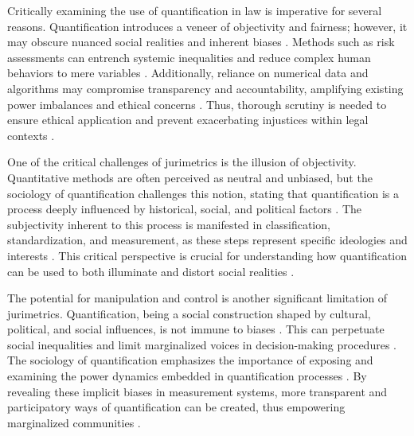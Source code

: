 Critically examining the use of quantification in law is imperative for several reasons. Quantification introduces a veneer of objectivity and fairness; however, it may obscure nuanced social realities and inherent biases \cite{gillborn2017,di2023,calvo2024}. Methods such as risk assessments can entrench systemic inequalities and reduce complex human behaviors to mere variables \cite{lynch2019,sareen2020,demortain2019}. Additionally, reliance on numerical data and algorithms may compromise transparency and accountability, amplifying existing power imbalances and ethical concerns \cite{ant2019,ribeiro2021}. Thus, thorough scrutiny is needed to ensure ethical application and prevent exacerbating injustices within legal contexts \cite{calvo2024,paiva2021}.

One of the critical challenges of jurimetrics is the illusion of objectivity. Quantitative methods are often perceived as neutral and unbiased, but the sociology of quantification challenges this notion, stating that quantification is a process deeply influenced by historical, social, and political factors \cite{10.1007/978-3-319-44000-215,10.3390/fi9040068}. The subjectivity inherent to this process is manifested in classification, standardization, and measurement, as these steps represent specific ideologies and interests \cite{10.1590/dados.2022.65.3.267,10.1007/978-3-319-44000-215}. This critical perspective is crucial for understanding how quantification can be used to both illuminate and distort social realities \cite{10.1590/dados.2022.65.3.267,10.3390/fi9040068}.

The potential for manipulation and control is another significant limitation of jurimetrics. Quantification, being a social construction shaped by cultural, political, and social influences, is not immune to biases \cite{10.1590/dados.2022.65.3.267,10.3390/fi9040068}. This can perpetuate social inequalities and limit marginalized voices in decision-making procedures \cite{10.1590/dados.2022.65.3.267,10.3390/fi9040068}. The sociology of quantification emphasizes the importance of exposing and examining the power dynamics embedded in quantification processes \cite{10.1057/s41599-020-00557-0,10.1080/07329113.2015.1046739}. By revealing these implicit biases in measurement systems, more transparent and participatory ways of quantification can be created, thus empowering marginalized communities \cite{10.1057/s41599-020-00557-0,10.1080/07329113.2015.1046739}.

